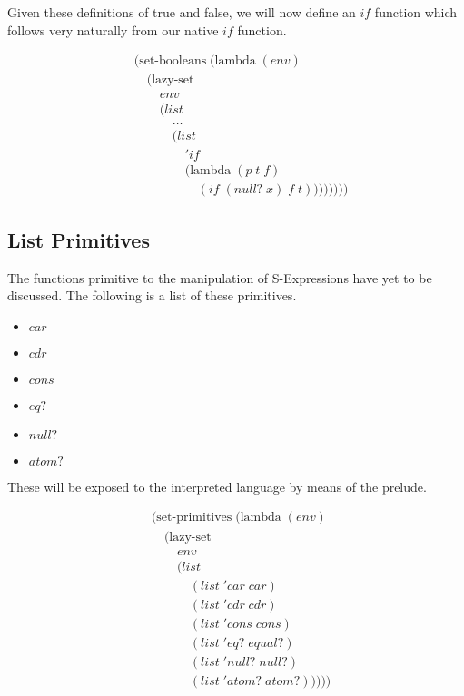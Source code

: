 Given these definitions of true and false, we will now define an $if$ 
function which follows very naturally from our native $if$ function.

\begin{figure}[ht]
\caption{}\label{scheme}
\begin{align*}
& (\text{set-booleans} \; (\text{lambda} \; (env) \; 
\\& \quad (\text{lazy-set} \; 
\\& \qquad env
\\& \qquad (list \; 
\\& \qquad \quad \dots
\\& \qquad \quad (list
\\& \qquad \qquad 'if \; 
\\& \qquad \qquad (\text{lambda} \; (p \; t \; f)
\\& \qquad \qquad \quad (if \; (null? \; x) \; f \; t))))))))
\end{align*}
\end{figure}

\subsection{List Primitives}
The functions primitive to the manipulation of S-Expressions have yet to be 
discussed. The following is a list of these primitives.

\begin{itemize}
  \item $car$
  \item $cdr$
  \item $cons$
  \item $eq?$
  \item $null?$
  \item $atom?$
\end{itemize}

These will be exposed to the interpreted language by means of the prelude.

\begin{figure}[ht]
\caption{}\label{scheme}
\begin{align*}
& (\text{set-primitives} \; (\text{lambda} \; (env)
\\& \quad (\text{lazy-set}
\\& \qquad env
\\& \qquad (list
\\& \qquad \quad (list \; 'car \; car)
\\& \qquad \quad (list \; 'cdr \; cdr)
\\& \qquad \quad (list \; 'cons \; cons)
\\& \qquad \quad (list \; 'eq? \; equal?)
\\& \qquad \quad (list \; 'null? \; null?)
\\& \qquad \quad (list \; 'atom? \; atom?)))))
\end{align*}
\end{figure}

